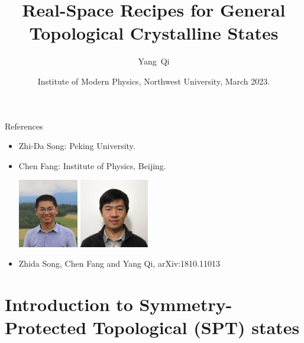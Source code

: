 \documentclass[xcolor=table, 10pt, aspectratio=43]{beamer}
\title[Space-group SPTs] %
{Real-Space Recipes for General Topological Crystalline States}
\author[Y Qi] %
{Yang~Qi}
\institute[Fudan] %
{Department of Physics, Fudan University}
\date{Institute of Modern Physics, Northwest University, March 2023.}
\begin{document}
\begin{frame}
  \titlepage
\end{frame}

\begin{frame}{References}
\begin{itemize}
\item Zhi-Da Song: Peking University.
\item Chen Fang: Institute of Physics, Beijing.
\begin{center}
	\includegraphics[height=3cm]{../people/zhidasong}
	\includegraphics[height=3cm]{../people/chenfang}
\end{center}
\item Zhida Song, Chen Fang and Yang Qi, arXiv:1810.11013
\end{itemize}
\end{frame}

\section{Introduction to Symmetry-Protected Topological (SPT) states}
\end{document}
